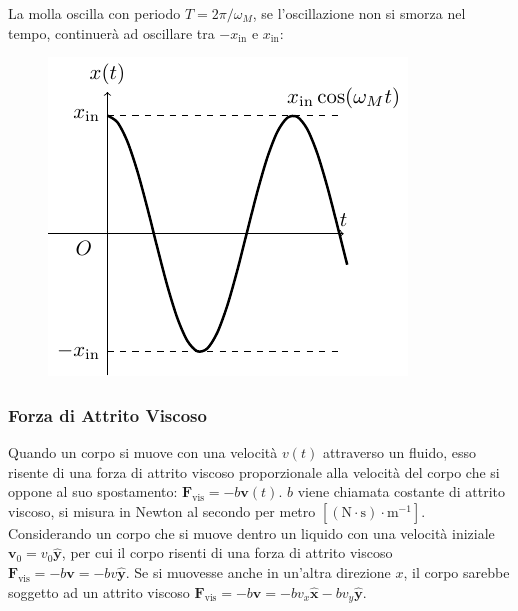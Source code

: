 \documentclass{article}
\newcommand{\vect}[1]{\boldsymbol{\mathbf{#1}}}
\numberwithin{equation}{subsection}
\begin{document}
La molla oscilla con periodo $T=2\pi/\omega_M$, se l'oscillazione non si smorza nel tempo, continuerà ad oscillare tra $-x_\mathrm{in}$ e $x_\mathrm{in}$:

\begin{figure}[H]%
    \centering
    \includegraphics{andamento-molla.pdf}%
\end{figure}

\subsubsection{Forza di Attrito Viscoso}
Quando un corpo si muove con una velocità $v(t)$ attraverso 
un fluido, esso risente di una forza di attrito viscoso 
proporzionale alla velocità del corpo che si oppone al 
suo spostamento: $\vect{F}_\mathrm{vis}=-b\vect{v}(t)$. $b$ viene 
chiamata costante di attrito viscoso, si misura in Newton al 
secondo per metro $\left[(\mathrm{N}\cdot \mathrm{s})\cdot{\mathrm{m}}^{-1}\right]$.
\\
Considerando un corpo che si muove dentro un liquido con una velocità iniziale $\vect{v}_0=v_{0}\hat{\vect{y}}$, per cui il corpo risenti di una forza di attrito viscoso $\vect{F}_\mathrm{vis}=-b\vect{v}=-bv\hat{\vect{y}}$. 
Se si muovesse anche in un'altra direzione $x$, il corpo sarebbe soggetto ad un attrito viscoso $\vect{F}_\mathrm{vis}=-b\vect{v}=-bv_x\hat{\vect{x}} -bv_y\hat{\vect{y}}$. 
\end{document}

